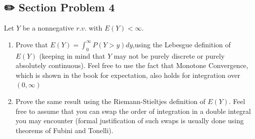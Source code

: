 \documentclass[
  letterpaper,
  DIV=11,
  numbers=noendperiod]{scrreprt}
\theoremstyle{plain}
\theoremstyle{definition}
\theoremstyle{remark}
\begin{document}
\hypertarget{section-problem-4-3}{%
\subsection*{✏️ Section Problem 4}\label{section-problem-4-3}}

Let \(Y\) be a nonnegative \(r.v.\) with \(E(Y)< \infty\).

\begin{enumerate}
\def\labelenumi{(\alph{enumi})}
\item
  Prove that \(E(Y) =\int_0^\infty P(Y > y)dy\),using the Lebesgue
  definition of \(E(Y)\) (keeping in mind that \(Y\) may not be purely
  discrete or purely absolutely continuous). Feel free to use the fact
  that Monotone Convergence, which is shown in the book for expectation,
  also holds for integration over \((0,\infty)\)
\item
  Prove the same result using the Riemann-Stieltjes definition of
  \(E(Y)\). Feel free to assume that you can swap the order of
  integration in a double integral you may encounter (formal
  justification of such swaps is usually done using theorems of Fubini
  and Tonelli).
\end{enumerate}
\end{document}
